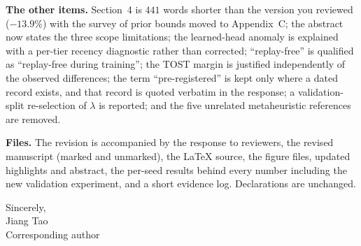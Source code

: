 \documentclass[11pt,a4paper]{article}
\begin{document}
\medskip
\noindent\textbf{The other items.} Section~4 is $441$ words shorter than the version you
reviewed ($-13.9\%$) with the survey of prior bounds moved to Appendix~C; the abstract now
states the three scope limitations; the learned-head anomaly is explained with a per-tier
recency diagnostic rather than corrected; ``replay-free'' is qualified as ``replay-free during
training''; the TOST margin is justified independently of the observed differences; the term
``pre-registered'' is kept only where a dated record exists, and that record is quoted verbatim
in the response; a validation-split re-selection of $\lambda$ is reported; and the five
unrelated metaheuristic references are removed.

\medskip
\noindent\textbf{Files.} The revision is accompanied by the response to reviewers, the revised
manuscript (marked and unmarked), the \LaTeX{} source, the figure files, updated highlights and
abstract, the per-seed results behind every number including the new validation experiment, and
a short evidence log. Declarations are unchanged.

\vspace{1pt}
\noindent Sincerely,\\[-2pt]
Jiang Tao\\
Corresponding author
\end{document}
